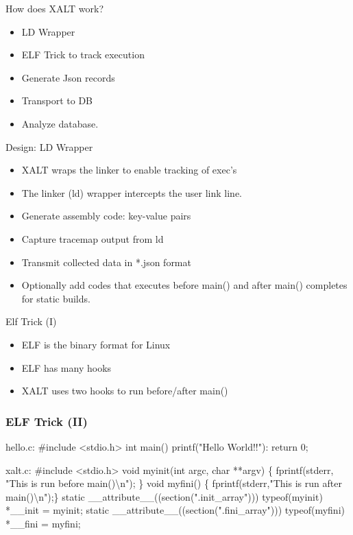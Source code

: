 \documentclass{beamer}
\begin{document}
\begin{frame}{How does XALT work?}
  \begin{itemize}
    \item LD Wrapper
    \item ELF Trick to track execution
    \item Generate Json records
    \item Transport to DB
    \item Analyze database.
  \end{itemize}
\end{frame}

\begin{frame}{Design: LD Wrapper}
  \begin{itemize}
    \item XALT wraps the linker to enable tracking of exec's
    \item The linker (ld) wrapper intercepts the user link line.
    \item Generate assembly code: key-value pairs
    \item Capture tracemap output from ld
    \item Transmit collected data in *.json format
    \item Optionally add codes that executes before main() and after
      main() completes for static builds.
  \end{itemize}
\end{frame}


\begin{frame}{Elf Trick (I)}
  \begin{itemize}
    \item ELF is the binary format for Linux
    \item ELF has many hooks
    \item XALT uses two hooks to run before/after main()
  \end{itemize}
\end{frame}

\begin{frame}[fragile]
    \frametitle{ELF Trick (II)}
 {\small
    \begin{semiverbatim}
  hello.c:
  #include <stdio.h>
  int main() { printf("Hello World!!\n"): return 0; }


  xalt.c:
  #include <stdio.h>
  void myinit(int argc, char **argv)
  \{ fprintf(stderr, "This is run before main()\textbackslash{}n"); \}
  void myfini()
  \{ fprintf(stderr,"This is run after main()\textbackslash{}n");\}
  static \_\_attribute\_\_((section(".init_array")))
       typeof(myinit) *\_\_init = myinit;
  static \_\_attribute\_\_((section(".fini_array")))
       typeof(myfini) *\_\_fini = myfini;
    \end{semiverbatim}
}
\end{frame}
\end{document}
